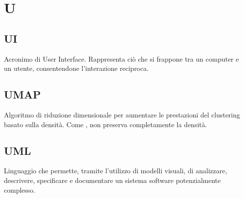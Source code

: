 \section*{U}
\markright{}

\subsection*{UI}
Acronimo di User Interface. Rappresenta ciò che si frappone tra un computer e un utente, consentendone l'interazione reciproca.

\subsection*{UMAP}
Algoritmo di riduzione dimensionale per aumentare le prestazioni del clustering basato sulla densità. Come , non preserva completamente la densità.

\subsection*{UML}
Linguaggio che permette, tramite l'utilizzo di modelli visuali, di analizzare, descrivere, specificare e documentare un sistema software potenzialmente complesso.
